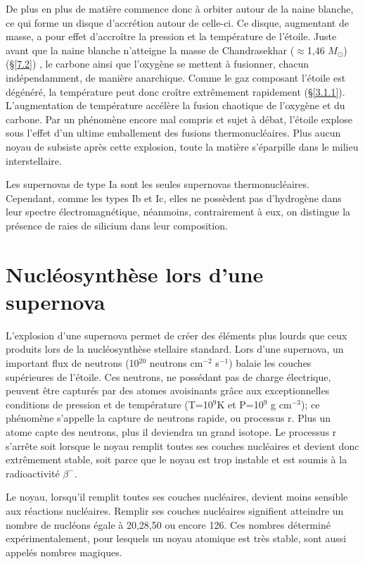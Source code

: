 De plus en plus de matière commence donc à orbiter autour de la naine blanche, ce qui forme un disque d'accrétion autour de celle-ci. Ce disque, augmentant de masse, a pour effet d'accroître la pression et la température de l'étoile. Juste avant que la naine blanche n'atteigne la masse de Chandrasekhar ($\approx$1,46 $M_\odot$)(§\ref{7.2}) 
 , le carbone ainsi que l'oxygène se mettent à fusionner, chacun indépendamment, de manière anarchique. Comme le gaz composant l'étoile est dégénéré, la température peut donc croître extrêmement rapidement (§\ref{3.1.1}). L'augmentation de température accélère la fusion chaotique de l'oxygène et du carbone. Par un phénomène encore mal compris et sujet à débat, l'étoile explose sous l'effet d'un ultime emballement des fusions thermonucléaires. Plus aucun noyau de subsiste après cette explosion, toute la matière s'éparpille dans le milieu interstellaire.\smallskip
 
 Les supernovas de type Ia sont les seules supernovas thermonucléaires. Cependant, comme les types Ib et Ic, elles ne possèdent pas d'hydrogène dans leur spectre électromagnétique, néanmoins, contrairement à eux, on distingue la présence de raies de silicium dans leur composition. 
 
 \section{Nucléosynthèse lors d'une supernova}\label{3.2} 
 
 L'explosion d'une supernova permet de créer des éléments plus lourds que ceux produits lors de la nucléosynthèse stellaire standard. Lors d'une supernova, un important flux de neutrons (10$^{20}$ neutrons cm$^{-2}$ s$^{-1}$) balaie les couches supérieures de l'étoile. Ces neutrons, ne possédant pas de charge électrique, peuvent être capturés par des atomes avoisinants grâce aux exceptionnelles conditions de pression et de température (T=10$^{9}$K et P=10$^{9}$ g cm$^{-3}$); ce phénomène s'appelle la capture de neutrons rapide, ou processus r\footnotemark[2]. 
 Plus un atome capte des neutrons, plus il deviendra un grand isotope. Le processus r s'arrête soit lorsque le noyau remplit toutes ses couches nucléaires et devient donc extrêmement stable, soit parce que le noyau est trop instable et est soumis à la radioactivité $\beta^{-}$.\smallskip
 
 Le noyau, lorsqu'il remplit toutes ses couches nucléaires, devient moins sensible aux réactions nucléaires. Remplir ses couches nucléaires signifient atteindre un nombre de nucléons égale à 20,28,50 ou encore 126. Ces nombres déterminé expérimentalement, pour lesquels un noyau atomique est très stable, sont aussi appelés nombres magiques.\smallskip 
 
